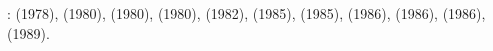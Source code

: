 \Literature: 
\textcite{gart78} (1978), 
\textcite{anbr80} (1980), 
\textcite{mera80} (1980), 
\textcite{bran80} (1980),
\textcite{engl82} (1982),
\textcite{thar85} (1985), 
\textcite{scan85} (1985),
\textcite{enho86} (1986), 
\textcite{mofr86} (1986),
\textcite{zupa86} (1986), 
\textcite{boww89} (1989).




